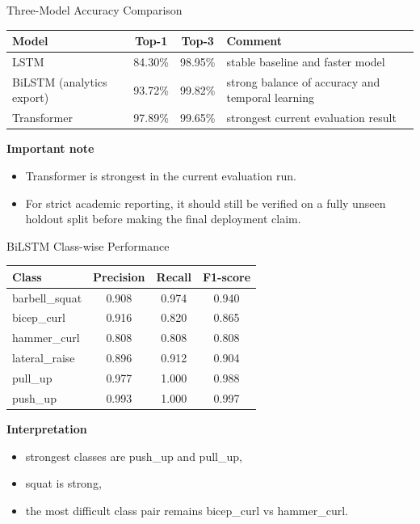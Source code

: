 \documentclass[aspectratio=169]{beamer}
\begin{document}
\begin{frame}{Three-Model Accuracy Comparison}
\small
\begin{tabular}{p{3.4cm} c c p{4.2cm}}
\toprule
\textbf{Model} & \textbf{Top-1} & \textbf{Top-3} & \textbf{Comment} \\
\midrule
LSTM & 84.30\% & 98.95\% & stable baseline and faster model \\
BiLSTM (analytics export) & 93.72\% & 99.82\% & strong balance of accuracy and temporal learning \\
Transformer & 97.89\% & 99.65\% & strongest current evaluation result \\
\bottomrule
\end{tabular}

\vspace{0.2cm}
\textbf{Important note}
\begin{itemize}
  \item Transformer is strongest in the current evaluation run.
  \item For strict academic reporting, it should still be verified on a fully unseen holdout split before making the final deployment claim.
\end{itemize}
\end{frame}

\begin{frame}{BiLSTM Class-wise Performance}
\small
\begin{tabular}{p{2.8cm} c c c}
\toprule
\textbf{Class} & \textbf{Precision} & \textbf{Recall} & \textbf{F1-score} \\
\midrule
barbell\_squat & 0.908 & 0.974 & 0.940 \\
bicep\_curl & 0.916 & 0.820 & 0.865 \\
hammer\_curl & 0.808 & 0.808 & 0.808 \\
lateral\_raise & 0.896 & 0.912 & 0.904 \\
pull\_up & 0.977 & 1.000 & 0.988 \\
push\_up & 0.993 & 1.000 & 0.997 \\
\bottomrule
\end{tabular}

\vspace{0.2cm}
\textbf{Interpretation}
\begin{itemize}
  \item strongest classes are push\_up and pull\_up,
  \item squat is strong,
  \item the most difficult class pair remains bicep\_curl vs hammer\_curl.
\end{itemize}
\end{frame}
\end{document}
